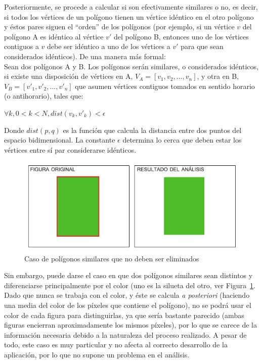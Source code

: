 {	Posteriormente, se procede a calcular si son efectivamente similares o no, es decir, si todos los vértices de un polígono tienen un vértice idéntico en el otro polígono y éstos pares siguen el ``orden'' de los polígonos (por ejemplo, si un vértice $v$ del polígono A es idéntico al vértice $v'$ del polígono B, entonces uno de los vértices contiguos a $v$ debe ser idéntico a uno de los vértices a $v'$ para que sean considerados idénticos). De una manera más formal:\\
		
	Sean dos polígonos A y B. Los polígonos serán similares, o considerados idénticos, si existe una disposición de vértices en A, $V_{A} = [v_{1}, v_{2}, ..., v_{n}]$, y otra en B, $V_{B} = [v'_{1}, v'_{2}, ..., v'_{n}]$ que asumen vértices contiguos tomados en sentido horario (o antihorario), tales que:
	
	\begin{center}
		$\forall k, 0 < k < N, dist(v_{k}, v'_{k}) < \epsilon$
	\end{center}
	
	Donde $dist(p,q)$ es la función que calcula la distancia entre dos puntos del espacio bidimensional. La constante $\epsilon$ determina lo cerca que deben estar los vértices entre sí par considerarse idénticos.\\
	
		\begin{figure}[!htbp]
		\centering
		\includegraphics[scale=0.47]{graphics/reppoly.png}
		\caption{Caso de polígonos similares que no deben ser eliminados}
		\label{fig:colorsimilares}
		\end{figure}
	
	Sin embargo, puede darse el caso en que dos polígonos similares sean distintos y diferenciarse principalmente por el color (uno es la silueta del otro, ver Figura~\ref{fig:colorsimilares}. Dado que nunca se trabaja con el color, y éste se calcula \emph{a posteriori} (haciendo una media del color de los píxeles que contiene el polígono), no se podrá usar el color de cada figura para distinguirlas, ya que sería bastante parecido (ambas figuras encierran aproximadamente los mismos píxeles), por lo que se carece de la información necesaria debido a la naturaleza del proceso realizado. A pesar de todo, este caso es muy particular y no afecta al correcto desarrollo de la aplicación, por lo que no supone un problema en el análisis.\\
	
}
